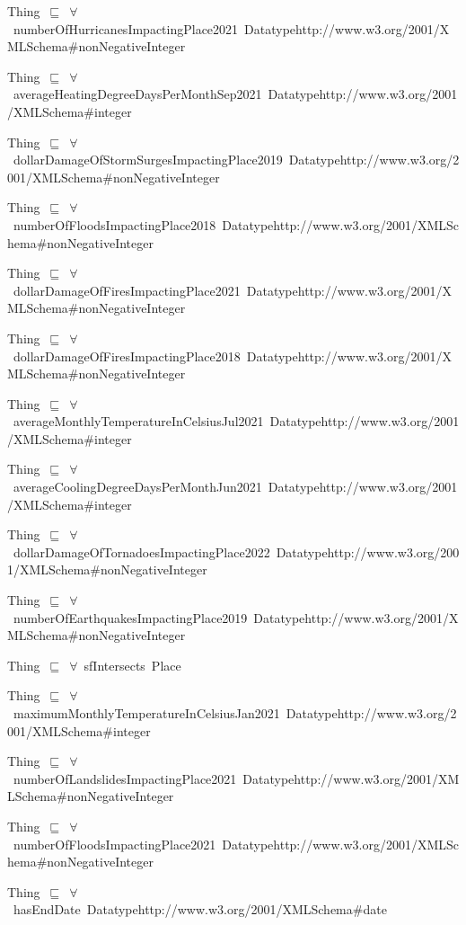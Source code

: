 \documentclass{article}
\begin{document}
Thing~\ensuremath{\sqsubseteq}~\ensuremath{\forall}~numberOfHurricanesImpactingPlace2021~Datatypehttp://www.w3.org/2001/XMLSchema#nonNegativeInteger~

Thing~\ensuremath{\sqsubseteq}~\ensuremath{\forall}~averageHeatingDegreeDaysPerMonthSep2021~Datatypehttp://www.w3.org/2001/XMLSchema#integer~

Thing~\ensuremath{\sqsubseteq}~\ensuremath{\forall}~dollarDamageOfStormSurgesImpactingPlace2019~Datatypehttp://www.w3.org/2001/XMLSchema#nonNegativeInteger~

Thing~\ensuremath{\sqsubseteq}~\ensuremath{\forall}~numberOfFloodsImpactingPlace2018~Datatypehttp://www.w3.org/2001/XMLSchema#nonNegativeInteger~

Thing~\ensuremath{\sqsubseteq}~\ensuremath{\forall}~dollarDamageOfFiresImpactingPlace2021~Datatypehttp://www.w3.org/2001/XMLSchema#nonNegativeInteger~

Thing~\ensuremath{\sqsubseteq}~\ensuremath{\forall}~dollarDamageOfFiresImpactingPlace2018~Datatypehttp://www.w3.org/2001/XMLSchema#nonNegativeInteger~

Thing~\ensuremath{\sqsubseteq}~\ensuremath{\forall}~averageMonthlyTemperatureInCelsiusJul2021~Datatypehttp://www.w3.org/2001/XMLSchema#integer~

Thing~\ensuremath{\sqsubseteq}~\ensuremath{\forall}~averageCoolingDegreeDaysPerMonthJun2021~Datatypehttp://www.w3.org/2001/XMLSchema#integer~

Thing~\ensuremath{\sqsubseteq}~\ensuremath{\forall}~dollarDamageOfTornadoesImpactingPlace2022~Datatypehttp://www.w3.org/2001/XMLSchema#nonNegativeInteger~

Thing~\ensuremath{\sqsubseteq}~\ensuremath{\forall}~numberOfEarthquakesImpactingPlace2019~Datatypehttp://www.w3.org/2001/XMLSchema#nonNegativeInteger~

Thing~\ensuremath{\sqsubseteq}~\ensuremath{\forall}~sfIntersects~Place~

Thing~\ensuremath{\sqsubseteq}~\ensuremath{\forall}~maximumMonthlyTemperatureInCelsiusJan2021~Datatypehttp://www.w3.org/2001/XMLSchema#integer~

Thing~\ensuremath{\sqsubseteq}~\ensuremath{\forall}~numberOfLandslidesImpactingPlace2021~Datatypehttp://www.w3.org/2001/XMLSchema#nonNegativeInteger~

Thing~\ensuremath{\sqsubseteq}~\ensuremath{\forall}~numberOfFloodsImpactingPlace2021~Datatypehttp://www.w3.org/2001/XMLSchema#nonNegativeInteger~

Thing~\ensuremath{\sqsubseteq}~\ensuremath{\forall}~hasEndDate~Datatypehttp://www.w3.org/2001/XMLSchema#date~
\end{document}
